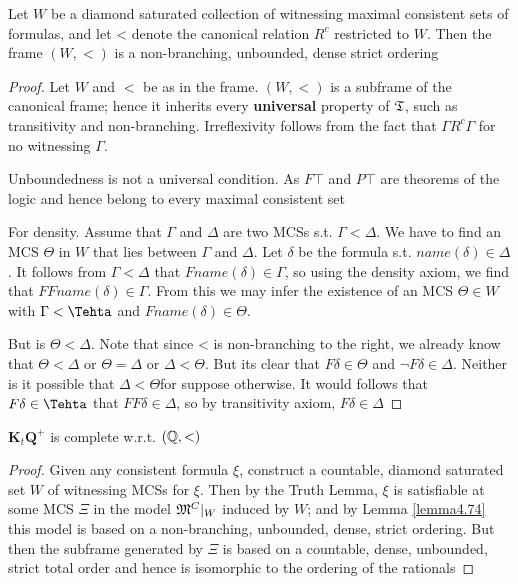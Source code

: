 \documentclass[11pt]{article}
\newcommand{\KtQ}{\textbf{K}_t\textbf{Q}}
\begin{document}
\begin{lemma}[]
\label{lemma4.74}
Let \(W\) be a diamond saturated collection of witnessing maximal consistent
sets of formulas, and let < denote the canonical relation \(R^c\) restricted
to \(W\). Then the frame \((W,<)\) is a non-branching, unbounded, dense
strict ordering
\end{lemma}

\begin{proof}
Let \(W\) and \(<\) be as in the frame. \((W,<)\) is a subframe of the
canonical frame; hence it inherits every \textbf{universal} property of \(\mathfrak{T}\), such
as transitivity and non-branching. Irreflexivity follows from the fact that
\(\Gamma R^c\Gamma\) for no witnessing \(\Gamma\).

Unboundedness is not a universal condition. As \(F\top\) and \(P\top\) are
theorems of the logic and hence belong to every maximal consistent set

For density. Assume that \(\Gamma\) and \(\Delta\) are two MCSs s.t. \(\Gamma<\Delta\). We have to
find an MCS \(\Theta\) in \(W\) that lies between \(\Gamma\) and \(\Delta\). Let \(\delta\) be the formula s.t.
\(name(\delta)\in\Delta\). It follows from \(\Gamma<\Delta\) that
\(Fname(\delta)\in\Gamma\), so using the density axiom, we find that
\(FFname(\delta)\in\Gamma\). From this we may infer the existence of an MCS
\(\Theta\in W\) with \(\Gamma<\Tehta\) and \(Fname(\delta)\in\Theta\).

But is \(\Theta<\Delta\). Note that since < is non-branching to the right, we
already know that \(\Theta<\Delta\) or \(\Theta=\Delta\) or \(\Delta<\Theta\). But its
clear that \(F\delta\in\Theta\) and \(\neg F\delta\in\Delta\). Neither is it
possible that \(\Delta<\Theta\)for suppose otherwise. It would follows that
\(F\delta\in\Tehta\) that \(FF\delta\in\Delta\), so by transitivity axiom, \(F\delta\in\Delta\)
\end{proof}

\begin{theorem}[]
\(\KtQ^+\) is complete w.r.t. \((\mathbb{Q},<)\)
\end{theorem}

\begin{proof}
Given any consistent formula \(\xi\), construct a countable, diamond saturated set
\(W\) of witnessing MCSs for \(\xi\). Then by the Truth Lemma, \(\xi\) is satisfiable at
some MCS \(\Xi\) in the model \(\mathfrak{M}^C\vert_W\) induced by \(W\); and by Lemma
\ref{lemma4.74} this model is based on a non-branching, unbounded, dense,
strict ordering. But then the subframe generated by \(\Xi\) is based on a
countable, dense, unbounded, strict total order and hence is isomorphic to
the ordering of the rationals
\end{proof}
\end{document}
